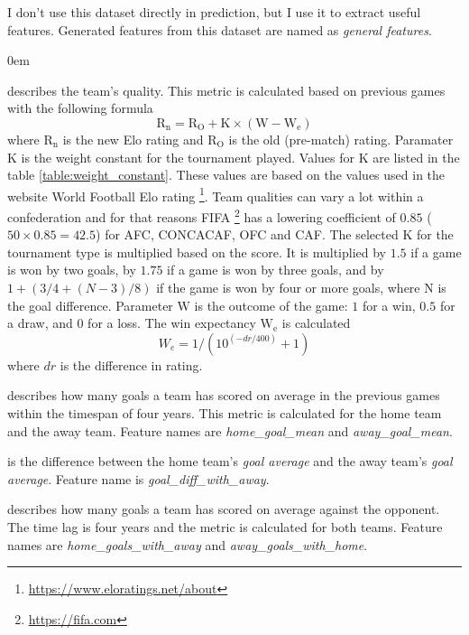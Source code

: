 I don't use this dataset directly in prediction, but I use it to extract useful features. Generated features from this dataset are named as \textit{general features}.
\renewcommand{\labelitemi}{}
\begin{description}
    \itemsep0em
    \item[Elo rating:] describes the team's quality. This metric is calculated based on previous games with the following formula \begin{equation}
        \mathrm { R } _ { \mathrm { n } } = \mathrm { R } _ { \mathrm { O } } + \mathrm { K } \times \left( \mathrm { W } - \mathrm { W } _ { \mathrm { e } } \right)
    \end{equation}
    where $\mathrm { R } _ { \mathrm { n } }$ is the new Elo rating and $\mathrm { R }  _ { \mathrm { O } }$ is the old (pre-match) rating. Paramater $\mathrm { K }$ is the weight constant for the tournament played. Values for $\mathrm { K }$ are listed in the table \ref{table:weight_constant}. These values are based on the values used in the website World Football Elo rating \footnote{\url{https://www.eloratings.net/about}}. Team qualities can vary a lot within a confederation and for that reasons FIFA \footnote{\url{https://fifa.com}} has a lowering coefficient of $0.85$ ($50 \times 0.85 = 42.5$) for AFC, CONCACAF, OFC and CAF. The selected $\mathrm { K }$ for the tournament type is multiplied based on the score. It is multiplied by $1.5$ if a game is won by two goals, by $1.75$ if a game is won by three goals, and by $1 + (3/4 + (N-3)/8)$ if the game is won by four or more goals, where N is the goal difference. Parameter $\mathrm { W }$ is the outcome of the game: $1$ for a win, $0.5$ for a draw, and $0$ for a loss. The win expectancy $\mathrm { W } _ { \mathrm { e } }$ is calculated
    \begin{equation}
        W _ { e } = 1 / \left( 10 ^ { ( - d r / 400 ) } + 1 \right)
    \end{equation}
    where $dr$ is the difference in rating.

    \item[Goal average:] describes how many goals a team has scored on average in the previous games within the timespan of four years. This metric is calculated for the home team and the away team. Feature names are \textit{home\_goal\_mean} and \textit{away\_goal\_mean}.
    \item[Goal average difference:] is the difference between the home team's \textit{goal average} and the away team's \textit{goal average}. Feature name is \textit{goal\_diff\_with\_away}.
    \item[Goal average with the opponent:] describes how many goals a team has scored on average against the opponent. The time lag is four years and the metric is calculated for both teams. Feature names are \textit{home\_goals\_with\_away} and \textit{away\_goals\_with\_home}.
\end{description}

